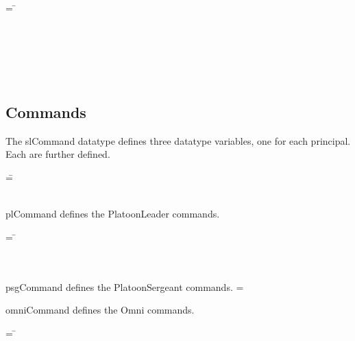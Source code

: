 \documentclass[../../main/main.tex]{subfiles}
\begin{document}
\begin{tabbing}
 = \= \\
					\>\HOLTokenBar{}  \\
					\>\HOLTokenBar{}  \\
					\>\HOLTokenBar{}  \\
					\>\HOLTokenBar{} \\
         				\>\HOLTokenBar{}  \\
					\>\HOLTokenBar{} \end{tabbing}

\subsection{Commands}
The slCommand datatype defines three datatype variables, one for each principal.  Each are further defined.
\begin{tabbing}
 =\= \\
  						\>\HOLTokenBar{}  \\
  						\>\HOLTokenBar{}  
\end{tabbing}

plCommand defines the PlatoonLeader commands.
\begin{tabbing}
 = \= \\
						\>\HOLTokenBar{}  \\
						\>\HOLTokenBar{}  \\
						\>\HOLTokenBar{} 
\end{tabbing}

psgCommand defines the PlatoonSergeant commands.
 =  \HOLTokenBar{} 

omniCommand defines the Omni commands.
\begin{tabbing}
 = \= \\
						\>\HOLTokenBar{} \\
            					\>\HOLTokenBar{}  \\
						\>\HOLTokenBar{} 
\end{tabbing}
\end{document}

